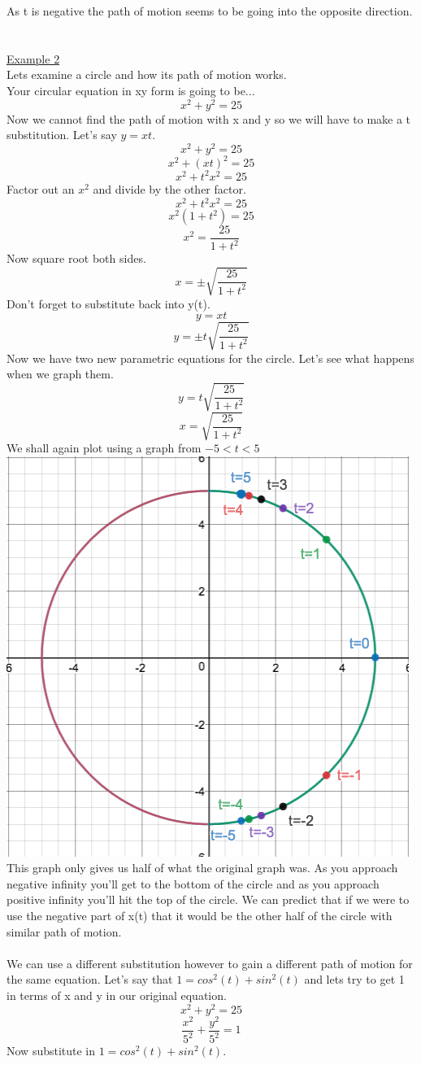 \documentclass[a4paper,openright, 14pt]{article}
\begin{document}
As t is negative the path of motion seems to be going into the opposite direction.\\
\\\\
\underline{Example 2}\\
Lets examine a circle and how its path of motion works.\\
Your circular equation in xy form is going to be...
$$x^2+y^2=25$$
Now we cannot find the path of motion with x and y so we will have to make a t substitution. Let's say $y=xt$.
$$x^2+y^2=25$$
$$x^2+(xt)^2=25$$
$$x^2+ t^2 x^2=25$$
Factor out an $x^2$ and divide by the other factor.
$$x^2+ t^2 x^2=25$$
$$x^2(1+ t^2)=25$$
$$x^2=\frac{25}{1+t^2}$$
Now square root both sides.
$$x=\pm \sqrt{\frac{25}{1+t^2}}$$
Don't forget to substitute back into y(t).
$$y=xt$$
$$y=\pm t \sqrt{\frac{25}{1+t^2}}$$
Now we have two new parametric equations for the circle. Let's see what happens when we graph them.
$$y=t \sqrt{\frac{25}{1+t^2}}$$
$$x=\sqrt{\frac{25}{1+t^2}}$$
We shall again plot using a graph from $-5<t<5$\\
\includegraphics[width = 7 cm, height = 7 cm]{JOSH.png}\\
This graph only gives us half of what the original graph was. As you approach negative infinity you'll get to the bottom of the circle and as you approach positive infinity you'll hit the top of the circle. We can predict that if we were to use the negative part of x(t) that it would be the other half of the circle with similar path of motion.\\\\
We can use a different substitution however to gain a different path of motion for the same equation. Let's say that $1=cos^2 (t) + sin^2(t)$ and lets try to get 1 in terms of x and y in our original equation.
$$x^2 +y^2=25$$
$$\frac{x^2}{5^2} +\frac{y^2}{5^2}=1$$
Now substitute in $1=cos^2 (t) + sin^2(t)$.
\end{document}
